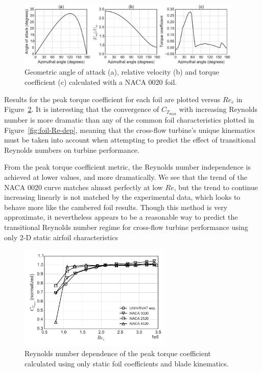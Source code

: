 \documentclass[energies,article,accept,moreauthors,pdftex,12pt,a4paper]{mdpi}
\begin{document}
\begin{figure}[ht!]
\centering
\includegraphics[width=0.95\textwidth]{figures/foil_kinematics_ct}
\caption{Geometric angle of attack (a), relative velocity (b) and torque coefficient
(c) calculated with a NACA 0020 foil.}
\label{fig:blade-kinematics}
\end{figure}

Results for the peak torque coefficient for each foil are plotted versus $Re_c$
in Figure~\ref{fig:foils-C_T-Re-dep}. It is interesting that the convergence of
$C_{T_\mathrm{max}}$ with increasing Reynolds number is more dramatic than any of the
common foil characteristics plotted in Figure~\ref{fig:foil-Re-dep}, meaning
that the cross-flow turbine's unique kinematics must be taken into account when
attempting to predict the effect of transitional Reynolds numbers on turbine
performance. 

From the peak torque coefficient metric, the Reynolds number independence is
achieved at lower values, and more dramatically. We see that the trend of the
NACA 0020 curve matches almost perfectly at low $Re$, but the trend to continue
increasing linearly is not matched by the experimental data, which looks to
behave more like the cambered foil results. Though this method is very
approximate, it nevertheless appears to be a reasonable way to predict the
transitional Reynolds number regime for cross-flow turbine performance using
only 2-D static airfoil characteristics

\begin{figure}[ht!]
\centering
\includegraphics[width=0.65\textwidth]{figures/cft_re_dep_foils}
\caption{Reynolds number dependence of the peak torque coefficient calculated using 
only static foil coefficients and blade kinematics.}
\label{fig:foils-C_T-Re-dep}
\end{figure}
\end{document}
